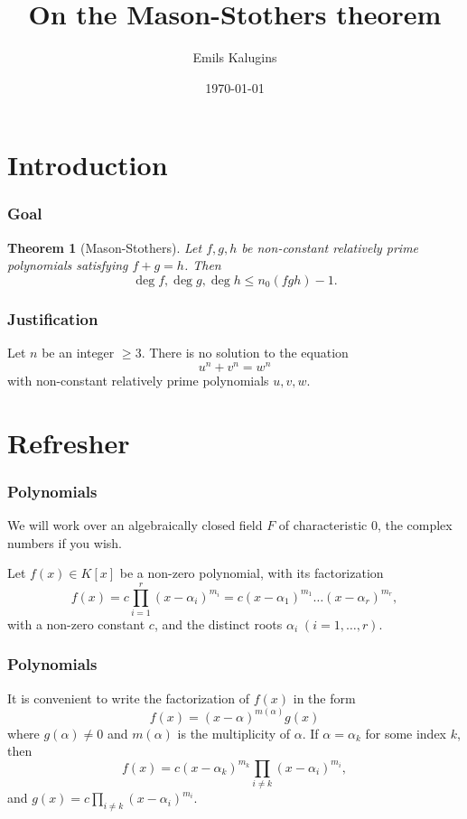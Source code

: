 \documentclass[envcountsect]{beamer}
\author{Emils Kalugins}
\title{On the Mason-Stothers theorem}
\institute{University of Latvia}
\date{\today}
\newtheorem*{theorem*}{Theorem}
\begin{document}
\begin{frame}
\maketitle

\end{frame}

\section{Introduction}

\begin{frame}
\frametitle{Goal}

\begin{theorem*}[Mason-Stothers]
Let $f,g,h$ be non-constant relatively prime polynomials satisfying $f+g=h$.
Then \[\operatorname{deg}f, \operatorname{deg}g, \operatorname{deg}h \leq
  n_0(fgh) -1.\]
\end{theorem*}
\end{frame}

\begin{frame}
\frametitle{Justification}
\begin{theorem}
Let $n$ be an integer $\geq 3.$ There is no solution to the equation \[u^n +
  v^n = w^n\] with non-constant relatively prime polynomials $u,v,w$. 
\end{theorem}

\end{frame}

\section{Refresher}
\begin{frame}
\frametitle{Polynomials}
We will work over an algebraically closed field $F$ of characteristic 0, the complex
numbers if you wish.

Let $f(x) \in K[x]$ be a non-zero polynomial, with its factorization
\begin{equation} \label{eq:fac}
  f(x) = c\prod_{i=1}^r(x-\alpha_i)^{m_i}=c(x-\alpha_1)^{m_{1}} \dots (x-\alpha_r)^{m_r},
\end{equation}
with a non-zero constant $c$, and the distinct roots $\alpha_i \; (i=1,\dots,r).$
\end{frame}

\begin{frame}
\frametitle{Polynomials}

It is convenient to write the factorization of $f(x)$ in the form
\[
  f(x) = (x-\alpha)^{m(\alpha)}g(x)
\]
where \( g ( \alpha ) \neq 0 \) and $ m ( \alpha ) $ is the
multiplicity of $\alpha$. If $ \alpha = \alpha_k $ for some index $k$, then
\[
f(x) = c(x- \alpha_k )^{m_k}\prod_{i \neq k}(x-\alpha_i)^{m_i},
\]
and $g(x) = c\prod\limits_{i \neq k}(x-\alpha_i)^{m_i}$.


\end{frame}
\end{document}

